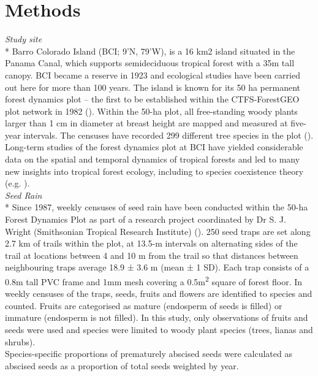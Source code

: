 \section{Methods}
\emph{Study site}\\*
Barro Colorado Island (BCI; 9’N, 79’W), is a 16 km2 island situated in the Panama Canal, which supports semideciduous tropical forest with a 35m tall canopy. BCI became a reserve in 1923 and ecological studies have been carried out here for more than 100 years. The island is known for its 50 ha permanent forest dynamics plot – the first to be established within the CTFS-ForestGEO plot network in 1982 (\cite{anderson-teixeiraCTFSForestGEOWorldwideNetwork2015}). Within the 50-ha plot, all free-standing woody plants larger than 1 cm in diameter at breast height are mapped and measured at five-year intervals. The censuses have recorded 299 different tree species in the plot (\cite{ anderson-teixeiraCTFSForestGEOWorldwideNetwork2015}). Long-term studies of the forest dynamics plot at BCI have yielded considerable data on the spatial and temporal dynamics of tropical forests and led to many new insights into tropical forest ecology, including to species coexistence theory (e.g. \cite{conditBetaDiversityTropicalForest2002, comitaTestingPredictionsJanzenConnell2014, harmsPervasiveDensitydependentRecruitment2000}).\\

\emph{Seed Rain}\\*
Since 1987, weekly censuses of seed rain have been conducted within the 50-ha Forest Dynamics Plot as part of a research project coordinated by Dr S. J. Wright (Smithsonian Tropical Research Institute) (\cite{ wrightAnnualSpatialVariation2005}). 250 seed traps are set along 2.7 km of trails within the plot, at 13.5-m intervals on alternating sides of the trail at locations between 4 and 10 m from the trail so that distances between neighbouring traps average 18.9 ± 3.6 m (mean ± 1 SD). Each trap consists of a 0.8m tall PVC frame and 1mm mesh covering a 0.5m\textsuperscript{2} square of forest floor. In weekly censuses of the traps, seeds, fruits and flowers are identified to species and counted. Fruits are categorised as mature (endosperm of seeds is filled) or immature (endosperm is not filled). In this study, only observations of fruits and seeds were used and species were limited to woody plant species (trees, lianas and shrubs). \\
Species-specific proportions of prematurely abscised seeds were calculated as abscised seeds as a proportion of total seeds weighted by year.

